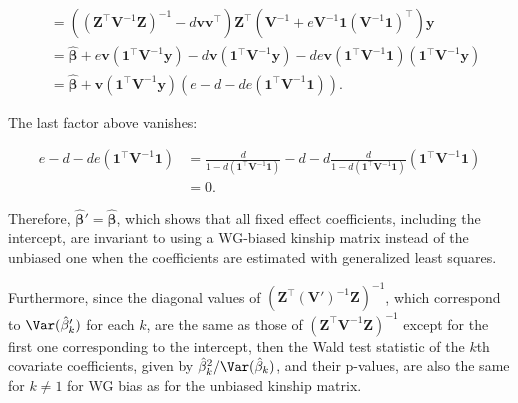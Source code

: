 \documentclass[11pt]{article}
\begin{document}
\begin{linenumbers}
\begin{appendices}
\begin{linenomath*}
\begin{align*}
    \\
    &=
      \left(   \left( \mathbf{Z}^\intercal \mathbf{V}^{-1} \mathbf{Z} \right)^{-1}
      - d \mathbf{v} \mathbf{v}^\intercal
      \right) \mathbf{Z}^\intercal \left( \mathbf{V}^{-1} + e \mathbf{V}^{-1} \mathbf{1} \left( \mathbf{V}^{-1} \mathbf{1} \right)^\intercal \right) \mathbf{y}
    \\
    &=
      \boldsymbol{\hat{\beta}}
      +
      e \mathbf{v} \left( \mathbf{1}^\intercal \mathbf{V}^{-1} \mathbf{y} \right)
      - d \mathbf{v} \left( \mathbf{1}^\intercal \mathbf{V}^{-1} \mathbf{y} \right)
      - d e \mathbf{v} \left( \mathbf{1}^\intercal \mathbf{V}^{-1} \mathbf{1} \right) \left( \mathbf{1}^\intercal \mathbf{V}^{-1} \mathbf{y} \right)
    \\
    &=
      \boldsymbol{\hat{\beta}}
      + \mathbf{v} \left( \mathbf{1}^\intercal \mathbf{V}^{-1} \mathbf{y} \right) \left(
      e 
      - d 
      - d e \left( \mathbf{1}^\intercal \mathbf{V}^{-1} \mathbf{1} \right)
      \right)
      .
  \end{align*}
  \end{linenomath*}
  The last factor above vanishes:
  \begin{linenomath*}
  \begin{align*}
    e 
    - d 
    - d e \left( \mathbf{1}^\intercal \mathbf{V}^{-1} \mathbf{1} \right)
    &=
      \frac{ d }{ 1 - d \left( \mathbf{1}^\intercal \mathbf{V}^{-1} \mathbf{1} \right) }
      - d 
      - d \frac{ d }{ 1 - d \left( \mathbf{1}^\intercal \mathbf{V}^{-1} \mathbf{1} \right) } \left( \mathbf{1}^\intercal \mathbf{V}^{-1} \mathbf{1} \right)
    \\
    &=
      0
      .
  \end{align*}
  \end{linenomath*}
  Therefore, $\boldsymbol{\hat{\beta}}' = \boldsymbol{\hat{\beta}}$, which shows that all fixed effect coefficients, including the intercept, are invariant to using a WG-biased kinship matrix instead of the unbiased one when the coefficients are estimated with generalized least squares.

  Furthermore, since the diagonal values of $\left( \mathbf{Z}^\intercal \left( \mathbf{V}' \right)^{-1} \mathbf{Z} \right)^{-1}$, which correspond to $\Var( \hat{\beta}_k' )$ for each $k$, are the same as those of $\left( \mathbf{Z}^\intercal \mathbf{V}^{-1} \mathbf{Z} \right)^{-1}$ except for the first one corresponding to the intercept, then the Wald test statistic of the $k$th covariate coefficients, given by $\hat{\beta}_k^2 / \Var( \hat{\beta}_k )$, and their p-values, are also the same for $k \ne 1$ for WG bias as for the unbiased kinship matrix.
  
\end{appendices}

\end{linenumbers}
\end{document}
